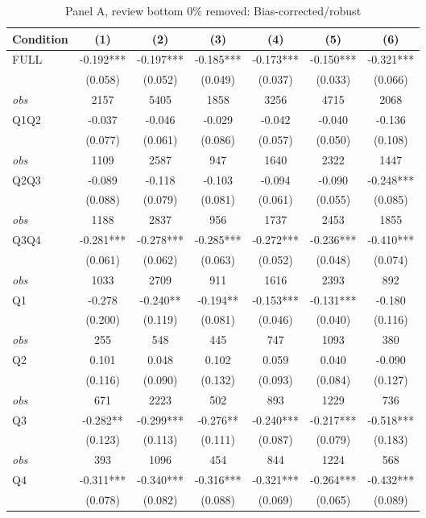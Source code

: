 \begin{table}[!htbp]
\centering
\caption{Panel A, review bottom 0\% removed: Bias-corrected/robust}
\begin{tabular}{lcccccc}
\toprule
Condition & (1) & (2) & (3) & (4) & (5) & (6) \\
\midrule
FULL & -0.192*** & -0.197*** & -0.185*** & -0.173*** & -0.150*** & -0.321*** \\
 & (0.058) & (0.052) & (0.049) & (0.037) & (0.033) & (0.066) \\
\textit{obs} & 2157 & 5405 & 1858 & 3256 & 4715 & 2068 \\
Q1Q2 & -0.037 & -0.046 & -0.029 & -0.042 & -0.040 & -0.136 \\
 & (0.077) & (0.061) & (0.086) & (0.057) & (0.050) & (0.108) \\
\textit{obs} & 1109 & 2587 & 947 & 1640 & 2322 & 1447 \\
Q2Q3 & -0.089 & -0.118 & -0.103 & -0.094 & -0.090 & -0.248*** \\
 & (0.088) & (0.079) & (0.081) & (0.061) & (0.055) & (0.085) \\
\textit{obs} & 1188 & 2837 & 956 & 1737 & 2453 & 1855 \\
Q3Q4 & -0.281*** & -0.278*** & -0.285*** & -0.272*** & -0.236*** & -0.410*** \\
 & (0.061) & (0.062) & (0.063) & (0.052) & (0.048) & (0.074) \\
\textit{obs} & 1033 & 2709 & 911 & 1616 & 2393 & 892 \\
Q1 & -0.278 & -0.240** & -0.194** & -0.153*** & -0.131*** & -0.180 \\
 & (0.200) & (0.119) & (0.081) & (0.046) & (0.040) & (0.116) \\
\textit{obs} & 255 & 548 & 445 & 747 & 1093 & 380 \\
Q2 & 0.101 & 0.048 & 0.102 & 0.059 & 0.040 & -0.090 \\
 & (0.116) & (0.090) & (0.132) & (0.093) & (0.084) & (0.127) \\
\textit{obs} & 671 & 2223 & 502 & 893 & 1229 & 736 \\
Q3 & -0.282** & -0.299*** & -0.276** & -0.240*** & -0.217*** & -0.518*** \\
 & (0.123) & (0.113) & (0.111) & (0.087) & (0.079) & (0.183) \\
\textit{obs} & 393 & 1096 & 454 & 844 & 1224 & 568 \\
Q4 & -0.311*** & -0.340*** & -0.316*** & -0.321*** & -0.264*** & -0.432*** \\
 & (0.078) & (0.082) & (0.088) & (0.069) & (0.065) & (0.089) \\

\end{tabular}
\end{table}
